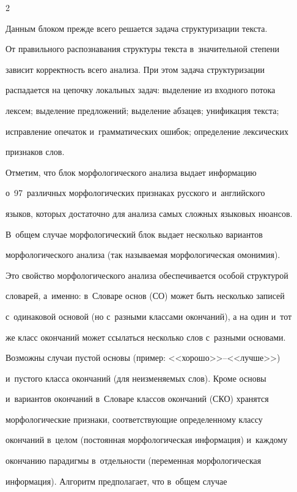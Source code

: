 \begin{multicols}{2}
     


     Данным блоком прежде всего решается задача структуризации текста. 


От правильного распознавания структуры текста в~значительной степени 


зависит корректность всего анализа. При этом задача структуризации 


распадается на цепочку локальных задач: выделение из входного потока 


лексем; выделение предложений; выделение абзацев; унификация текста; 


исправление опечаток и~грамматических ошибок; определение лексических 


признаков слов.


     


     Отметим, что блок морфологического анализа выдает информацию 


о~97~различных морфологических признаках русского и~английского 


языков, которых достаточно для анализа самых сложных языковых нюансов. 


В~общем случае морфологический блок выдает несколько вариантов 


морфологического анализа (так называемая морфологическая омонимия). 


Это свойство морфологического анализа обеспечивается особой структурой 


словарей, а~именно: в~Словаре основ (СО) может быть несколько записей 


с~одинаковой основой (но с~разными классами окончаний), а на один и~тот 


же класс окончаний может ссылаться несколько слов с~разными основами. 


Возможны случаи пустой основы (пример: <<хорошо>>--<<лучше>>) 


и~пустого класса окончаний (для неизменяемых слов). Кроме основы 


и~вариантов окончаний в~Словаре классов окончаний (СКО) хранятся 


морфологические признаки, соответствующие определенному классу 


окончаний в~целом (постоянная морфологическая информация) и~каждому 


окончанию парадигмы в~отдельности (переменная морфологическая 


информация). Алгоритм предполагает, что в~общем случае 



\end{multicols}
